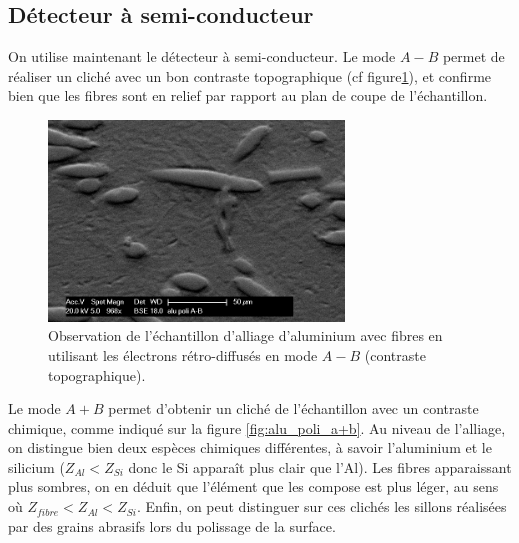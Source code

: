 \documentclass[a4paper,12pt]{article}
\begin{document}
\subsection{Détecteur à semi-conducteur}

On utilise maintenant le détecteur à semi-conducteur.
Le mode $A-B$ permet de réaliser un cliché avec un bon contraste topographique (cf figure\ref{fig:alu_poli_a-b}), et confirme bien que les fibres sont en relief par rapport au plan de coupe de l'échantillon.

\begin{figure}[h]
\centering
\includegraphics[width=0.7\textwidth]{images/alu_er_amb.png}
\caption{Observation de l'échantillon d'alliage d'aluminium avec fibres en utilisant les électrons rétro-diffusés en mode $A-B$ (contraste topographique).}
\label{fig:alu_poli_a-b}
\end{figure}

Le mode $A+B$ permet d'obtenir un cliché de l'échantillon avec un contraste chimique, comme indiqué sur la figure \ref{fig:alu_poli_a+b}.
Au niveau de l'alliage, on distingue bien deux espèces chimiques différentes, à savoir l'aluminium et le silicium ($Z_{Al}<Z_{Si}$ donc le Si apparaît plus clair que l'Al).
Les fibres apparaissant plus sombres, on en déduit que l'élément que les compose est plus léger, au sens où $Z_{fibre}<Z_{Al}<Z_{Si}$.
Enfin, on peut distinguer sur ces clichés les sillons réalisées par des grains abrasifs lors du polissage de la surface.
\end{document}
